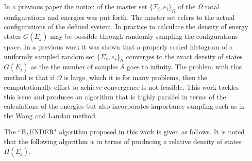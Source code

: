 \documentclass[aps,prl,reprint,superscriptaddress,showkeys]{revtex4-1}
\begin{document}
  In a previous paper the notion of the master set $\{ \Sigma_i, e_i \}_\Omega $ of the $\Omega$ total configurations and energies was put forth. The master set refers to the actual configurations of the defined system. In practice to calculate the density of energy states $G(E_j)$  may be possible through randomly sampling the configurations space.  In a previous work it was shown that a properly scaled histogram of a uniformly sampled random set $\{ \Sigma_s, e_s \}_\mathcal{S}$ converges to the exact density of states $G(E_j)$ as the the number of samples $\mathcal{S}$ goes to infinity. The problem with this method is that if $\Omega$ is large, which it is for many problems,  then the computationally effort to achieve convergence is not feasible.  This work tackles this issue and produces an algorithm that is highly parallel in terms of the calculations of the energies  but also incorporates importance sampling such as in the Wang and Landau method.
   
The ``B$_{L}$ENDER" algorithm proposed in this work  is given as follows. It is noted that the following algorithm is in terms of producing a relative density of states $H(E_j)$. 
\end{document}
